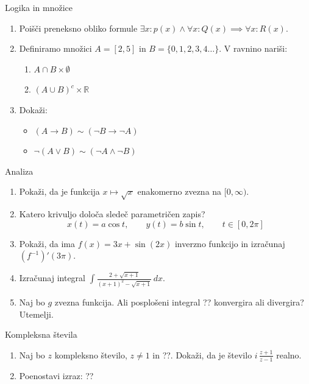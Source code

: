 \begin{frame}{Logika in množice}
	\begin{enumerate}
		\item
		Poišči preneksno obliko formule \(\exists x \colon p(x) \land \forall x \colon Q(x) \implies \forall x \colon R(x) \).
		\item 
		Definiramo množici \(A = [2,5]\) in \( B = \{0,1,2,3,4 \ldots\}\).
		V ravnino nariši:
		\begin{enumerate}
		   \item \( A \cap B \times \emptyset\)
		   \item \( (A\cup B)^c \times \mathbb{R} \)
		\end{enumerate}
		\item
		Dokaži:
		\begin{itemize}
			\item \( (A \rightarrow B) \sim (\lnot B \rightarrow \lnot A) \)
			\item \(\lnot (A \lor B) \sim (\lnot A \land \lnot B)\)
		\end{itemize}
	\end{enumerate}
\end{frame}

\begin{frame}{Analiza}
	\begin{enumerate}
		\item
		Pokaži, da je funkcija \( x \mapsto \sqrt{x} \) enakomerno zvezna na \([0, \infty)\).
		\item 
		Katero krivuljo določa sledeč parametričen zapis?
		$$
		   x(t) = a \cos t, \qquad %
		   y(t) = b \sin t,  \qquad %
		   t \in [0, 2 \pi]
		$$ 
		\item
		Pokaži, da ima \( f(x) = 3x + \sin(2x) \) inverzno funkcijo in izračunaj \( (f^{-1})'(3 \pi) \).
		
		\item
		Izračunaj integral 
		\( \int \frac{2+\sqrt{x+1}}{(x+1)^2-\sqrt{x+1}} \, dx \). 
		\item 
		Naj bo $g$ zvezna funkcija. Ali posplošeni integral 
		??
		konvergira ali divergira? Utemelji.
	\end{enumerate}
\end{frame}

\begin{frame}{Kompleksna števila}
	\begin{enumerate}
		\item
		Naj bo $z$ kompleksno število, $z \ne 1$ in ??.
		Dokaži, da je število \( i \, \frac{z+1}{z-1} \) realno.
		\item
		Poenostavi izraz:
		??
	\end{enumerate}
\end{frame}